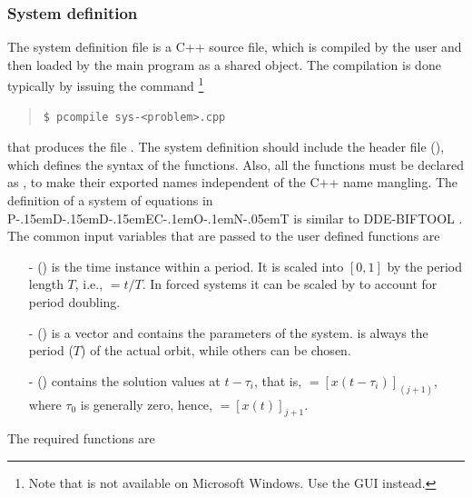 \documentclass[10pt,a4paper]{ddedoc}
\def\knut{{P\kern-.15emD\kern-.15emD\kern-.15emE\raisebox{.25ex}{-}C\kern-.1emO\kern-.1emN\kern-.05emT}}
\begin{document}
\subsubsection{System definition}\label{sysdef}

The system definition file is a C++ source file, which is compiled by the user
and then loaded by the main program  as a shared object. The
compilation is done typically by issuing the command%
\footnote{Note that  is not available on Microsoft Windows. Use the GUI instead.}
{ \small \begin{quote} \begin{lstlisting}[basicstyle=\tt,frame=single]
$ pcompile sys-<problem>.cpp
\end{lstlisting} \end{quote} } \noindent
that produces the file .
The system definition should include the header file 
(), which defines the syntax of the functions. Also, all
the functions must be declared as , to make their exported names
independent of the C++ name mangling. The definition of a system of equations in
\knut{} is similar to DDE-BIFTOOL \cite{DDEBIF}. The common input variables that
are passed to the user defined functions are
\begin{itemize}
  \item[-]  () is the time instance within a period. It is
  scaled into $[ 0, 1 ]$ by the period length $T$, i.e., $ = t/T$. In forced systems
  it can be scaled by  to account for period doubling.
  \item[-]  () is a vector and contains the parameters of
  the system.  is always the period ($T$) of the actual orbit,
  while others can be chosen.
  \item[-]  () contains the solution values at $t -
  \tau_i$, that is, $= [ x ( t - \tau_i ) ]_{(j+1)}$, where
$\tau_0$ is generally zero, hence, $=[x(t)]_{j+1}$.
\end{itemize}
The required functions are
\end{document}

